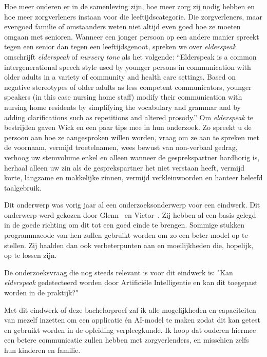 Hoe meer ouderen er in de samenleving zijn, hoe meer zorg zij nodig hebben en hoe meer zorgverleners instaan voor die leeftijdscategorie.
Die zorgverleners, maar evengoed familie of omstaanders weten niet altijd even goed hoe ze moeten omgaan met senioren.
Wanneer een jonger persoon op een andere manier spreekt tegen een senior dan tegen een leeftijdsgenoot, spreken we over \textit{elderspeak}. \textcite{Williams2011} omschrijft \textit{elderspeak} of \textit{nursery tone} als het volgende: \enquote{Elderspeak is a common intergenerational speech style used by younger persons in communication with older adults in a variety of community and health care settings. Based on negative stereotypes of older adults as less competent communicators, younger speakers (in this case nursing home staff) modify their communication with nursing home residents by simplifying the vocabulary and grammar and by adding clarifications such as repetitions and altered prosody.} Om \textit{elderspeak} te bestrijden gaven Wick en \textcite{Wick2007} een paar tips mee in hun onderzoek.
Zo spreekt u de persoon aan hoe ze aangesproken willen worden, vraag om ze aan te spreken met de voornaam, vermijd troetelnamen, wees bewust van non-verbaal gedrag, verhoog uw stemvolume enkel en alleen wanneer de gesprekspartner hardhorig is, herhaal alleen uw zin als de gesprekspartner het niet verstaan heeft, vermijd korte, langzame en makkelijke zinnen, vermijd verkleinwoorden en hanteer beleefd taalgebruik.

Dit onderwerp was vorig jaar al een onderzoeksonderwerp voor een eindwerk.
Dit onderwerp werd gekozen door Glenn~\textcite{Beeckman2021} en Victor~\textcite{Standaert2021}.
Zij hebben al een basis gelegd in de goede richting om dit tot een goed einde te brengen.
Sommige stukken programmacode van hen zullen gebruikt worden om zo een beter model op te stellen.
Zij haalden dan ook verbeterpunten aan en moeilijkheden die, hopelijk, op te lossen zijn.

De onderzoeksvraag die nog steeds relevant is voor dit eindwerk is: "Kan \textit{elderspeak} gedetecteerd worden door Artificiële Intelligentie en kan dit toegepast worden in de praktijk?"

Met dit eindwerk of deze bachelorproef zal ik alle mogelijkheden en capaciteiten van mezelf inzetten om een applicatie én AI-model te maken zodat dit kan getest en gebruikt worden in de opleiding verpleegkunde.
Ik hoop dat ouderen hiermee een betere communicatie zullen hebben met zorgverlenders, en misschien zelfs hun kinderen en familie.


